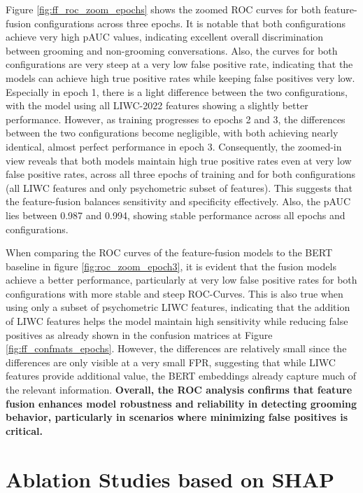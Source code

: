 Figure \ref{fig:ff_roc_zoom_epochs} shows the zoomed ROC curves for both feature-fusion configurations across three epochs. It is notable that both configurations achieve very high pAUC values, indicating excellent overall discrimination between grooming and non-grooming conversations. Also, the curves for both configurations are very steep at a very low false positive rate, indicating that the models can achieve high true positive rates while keeping false positives very low. Especially in epoch 1, there is a light difference between the two configurations, with the model using all LIWC-2022 features showing a slightly better performance. However, as training progresses to epochs 2 and 3, the differences between the two configurations become negligible, with both achieving nearly identical, almost perfect performance in epoch 3. Consequently, the zoomed-in view reveals that both models maintain high true positive rates even at very low false positive rates, across all three epochs of training and for both configurations (all LIWC features and only psychometric subset of features). This suggests that the feature-fusion balances sensitivity and specificity effectively. Also, the pAUC lies between 0.987 and 0.994, showing stable performance across all epochs and configurations.

When comparing the ROC curves of the feature-fusion models to the BERT baseline in figure \ref{fig:roc_zoom_epoch3}, it is evident that the fusion models achieve a  better performance, particularly at very low false positive rates for both configurations with more stable and steep ROC-Curves. This is also true when using only a subset of psychometric LIWC features, indicating that the addition of LIWC features helps the model maintain high sensitivity while reducing false positives as already shown in the confusion matrices at Figure \ref{fig:ff_confmats_epochs}. However, the differences are relatively small since the differences are only visible at a very small FPR, suggesting that while LIWC features provide additional value, the BERT embeddings already capture much of the relevant information. \textbf{Overall, the ROC analysis confirms that feature fusion enhances model robustness and reliability in detecting grooming behavior, particularly in scenarios where minimizing false positives is critical.} 

\section{Ablation Studies based on SHAP} \label{sec:ablation_studies_shap}

